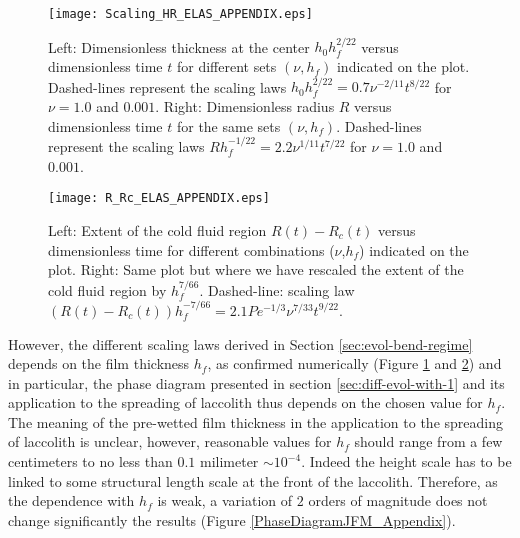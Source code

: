 \begin{figure}
  \begin{center}
    \graphicspath{ {/Users/thorey/Documents/These/Projet/Refroidissement/Skin_Model/Figure/JFM_V13/} }
    \texttt{[image: Scaling\_HR\_ELAS\_APPENDIX.eps]}
    \caption{Left:    Dimensionless    thickness   at    the    center
      $h_0h_f^{2/22}$ versus dimensionless time $t$ for different sets
      $(\nu,h_f)$ indicated  on the plot.  Dashed-lines  represent the
      scaling   laws   $h_0h_f^{2/22}=   0.7\nu^{-2/11}t^{8/22}$   for
      $\nu = 1.0$ and $0.001$.  Right: Dimensionless radius $R$ versus
      dimensionless   time  $t$   for  the   same  sets   $(\nu,h_f)$.
      Dashed-lines       represent        the       scaling       laws
      $Rh_f^{-1/22}=  2.2\nu^{1/11}t^{7/22}$  for   $\nu  =  1.0$  and
      $0.001$.}
    \label{Scaling_HR_ELAS_APPENDIX}
  \end{center}
\end{figure}
\begin{figure}
  \begin{center}
    \graphicspath{ {/Users/thorey/Documents/These/Projet/Refroidissement/Skin_Model/Figure/JFM_V13/} }
    \texttt{[image: R\_Rc\_ELAS\_APPENDIX.eps]}
    \caption{Left:  Extent  of  the cold  fluid  region  $R(t)-R_c(t)$
      versus    dimensionless   time    for   different    combinations
      ($\nu$,$h_f$) indicated on the plot.  Right: Same plot but where
      we  have  rescaled  the  extent  of the  cold  fluid  region  by
      $h_f^{7/66}$.          Dashed-line:          scaling         law
      $(R(t)-R_c(t))h_f^{-7/66}= 2.1 Pe^{-1/3}\nu^{7/33}t^{9/22}$.}
    \label{R_Rc_ELAS_APPENDIX}
  \end{center}
\end{figure}

However,   the    different   scaling   laws   derived    in   Section
\ref{sec:evol-bend-regime}  depends on  the film  thickness $h_f$,  as
confirmed   numerically  (Figure   \ref{Scaling_HR_ELAS_APPENDIX}  and
\ref{R_Rc_ELAS_APPENDIX})  and   in  particular,  the   phase  diagram
presented in section \ref{sec:diff-evol-with-1} and its application to
the spreading of laccolith thus depends on the chosen value for $h_f$.
The meaning of the pre-wetted film thickness in the application to the
spreading  of laccolith  is  unclear, however,  reasonable values  for
$h_f$  should range  from  a few  centimeters to  no  less than  $0.1$
milimeter $\sim 10^{-4}$. Indeed the height  scale has to be linked to
some  structural  length   scale  at  the  front   of  the  laccolith.
Therefore, as  the dependence with $h_f$  is weak, a variation  of $2$
orders of magnitude does not  change significantly the results (Figure
\ref{PhaseDiagramJFM_Appendix}).

